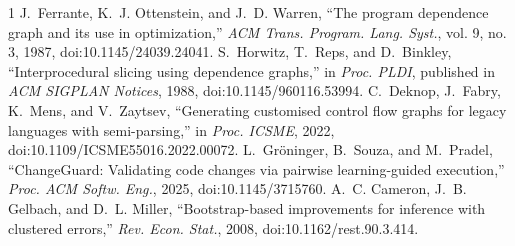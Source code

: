 \documentclass[conference]{IEEEtran}
\begin{document}
\begin{thebibliography}{1}
 J.~Ferrante, K.~J. Ottenstein, and J.~D. Warren, ``The program dependence graph and its use in optimization,'' \emph{ACM Trans. Program. Lang. Syst.}, vol. 9, no. 3, 1987, doi:10.1145/24039.24041.
 S.~Horwitz, T.~Reps, and D.~Binkley, ``Interprocedural slicing using dependence graphs,'' in \emph{Proc. PLDI}, published in \emph{ACM SIGPLAN Notices}, 1988, doi:10.1145/960116.53994.
 C.~Deknop, J.~Fabry, K.~Mens, and V.~Zaytsev, ``Generating customised control flow graphs for legacy languages with semi-parsing,'' in \emph{Proc. ICSME}, 2022, doi:10.1109/ICSME55016.2022.00072.
 L.~Gr\"oninger, B.~Souza, and M.~Pradel, ``ChangeGuard: Validating code changes via pairwise learning-guided execution,'' \emph{Proc. ACM Softw. Eng.}, 2025, doi:10.1145/3715760.
 A.~C. Cameron, J.~B. Gelbach, and D.~L. Miller, ``Bootstrap-based improvements for inference with clustered errors,'' \emph{Rev. Econ. Stat.}, 2008, doi:10.1162/rest.90.3.414.
\end{thebibliography}
\end{document}
